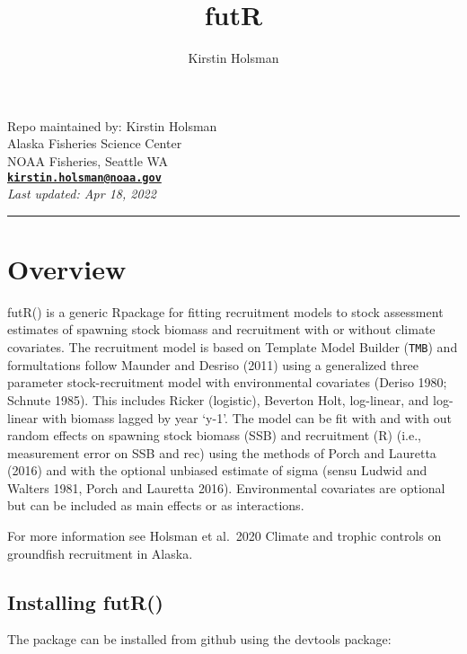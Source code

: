 \documentclass[
]{article}
\title{futR}
\author{Kirstin Holsman}
\date{}
\begin{document}
\maketitle

{
\setcounter{tocdepth}{2}
\tableofcontents
}
Repo maintained by: Kirstin Holsman\\
Alaska Fisheries Science Center\\
NOAA Fisheries, Seattle WA\\
\textbf{\href{mailto:kirstin.holsman@noaa.gov}{\nolinkurl{kirstin.holsman@noaa.gov}}}\\
\emph{Last updated: Apr 18, 2022}

\begin{center}\rule{0.5\linewidth}{0.5pt}\end{center}

\hypertarget{overview}{%
\section{Overview}\label{overview}}

futR() is a generic Rpackage for fitting recruitment models to stock
assessment estimates of spawning stock biomass and recruitment with or
without climate covariates. The recruitment model is based on Template
Model Builder (\texttt{TMB}) and formultations follow Maunder and
Desriso (2011) using a generalized three parameter stock-recruitment
model with environmental covariates (Deriso 1980; Schnute 1985). This
includes Ricker (logistic), Beverton Holt, log-linear, and log-linear
with biomass lagged by year `y-1'. The model can be fit with and with
out random effects on spawning stock biomass (SSB) and recruitment (R)
(i.e., measurement error on SSB and rec) using the methods of Porch and
Lauretta (2016) and with the optional unbiased estimate of sigma (sensu
Ludwid and Walters 1981, Porch and Lauretta 2016). Environmental
covariates are optional but can be included as main effects or as
interactions.

For more information see Holsman et al.~2020 Climate and trophic
controls on groundfish recruitment in Alaska.

\hypertarget{installing-futr}{%
\subsection{Installing futR()}\label{installing-futr}}

The package can be installed from github using the devtools package:
\end{document}
